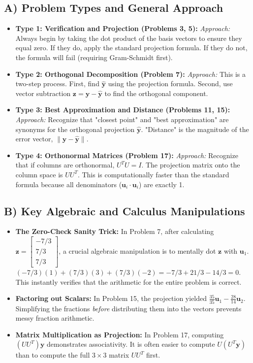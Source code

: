 \documentclass[11pt, letterpaper]{article}
\theoremstyle{definition}
\theoremstyle{remark}
\begin{document}
\subsection{A) Problem Types and General Approach}
\begin{itemize}
    \item \textbf{Type 1: Verification and Projection (Problems 3, 5):} 
    \textit{Approach:} Always begin by taking the dot product of the basis vectors to ensure they equal zero. If they do, apply the standard projection formula. If they do not, the formula will fail (requiring Gram-Schmidt first).
    \item \textbf{Type 2: Orthogonal Decomposition (Problem 7):} 
    \textit{Approach:} This is a two-step process. First, find $\hat{\mathbf{y}}$ using the projection formula. Second, use vector subtraction $\mathbf{z} = \mathbf{y} - \hat{\mathbf{y}}$ to find the orthogonal component.
    \item \textbf{Type 3: Best Approximation and Distance (Problems 11, 15):} 
    \textit{Approach:} Recognize that "closest point" and "best approximation" are synonyms for the orthogonal projection $\hat{\mathbf{y}}$. "Distance" is the magnitude of the error vector, $\|\mathbf{y} - \hat{\mathbf{y}}\|$.
    \item \textbf{Type 4: Orthonormal Matrices (Problem 17):} 
    \textit{Approach:} Recognize that if columns are orthonormal, $U^T U = I$. The projection matrix onto the column space is $U U^T$. This is computationally faster than the standard formula because all denominators ($\mathbf{u}_i \cdot \mathbf{u}_i$) are exactly 1.
\end{itemize}

\subsection{B) Key Algebraic and Calculus Manipulations}
\begin{itemize}
    \item \textbf{The Zero-Check Sanity Trick:} In Problem 7, after calculating $\mathbf{z} = \begin{bmatrix} -7/3 \\ 7/3 \\ 7/3 \end{bmatrix}$, a crucial algebraic manipulation is to mentally dot $\mathbf{z}$ with $\mathbf{u}_1$. $(-7/3)(1) + (7/3)(3) + (7/3)(-2) = -7/3 + 21/3 - 14/3 = 0$. This instantly verifies that the arithmetic for the entire problem is correct.
    \item \textbf{Factoring out Scalars:} In Problem 15, the projection yielded $\frac{35}{35}\mathbf{u}_1 - \frac{28}{14}\mathbf{u}_2$. Simplifying the fractions \textit{before} distributing them into the vectors prevents messy fraction arithmetic.
    \item \textbf{Matrix Multiplication as Projection:} In Problem 17, computing $(U U^T)\mathbf{y}$ demonstrates associativity. It is often easier to compute $U(U^T \mathbf{y})$ than to compute the full $3 \times 3$ matrix $U U^T$ first.
\end{itemize}
\end{document}
